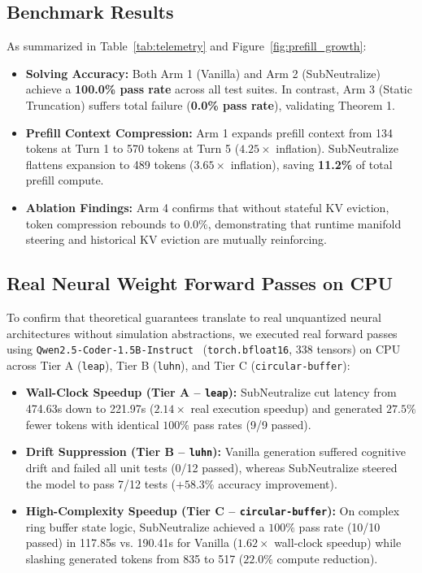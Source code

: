 \documentclass[10pt,twocolumn,letterpaper]{article}
\begin{document}
\subsection{Benchmark Results}
As summarized in Table~\ref{tab:telemetry} and Figure~\ref{fig:prefill_growth}:
\begin{itemize}
    \item \textbf{Solving Accuracy:} Both Arm 1 (Vanilla) and Arm 2 (SubNeutralize) achieve a \textbf{100.0\% pass rate} across all test suites. In contrast, Arm 3 (Static Truncation) suffers total failure (\textbf{0.0\% pass rate}), validating Theorem 1.
    \item \textbf{Prefill Context Compression:} Arm 1 expands prefill context from 134 tokens at Turn 1 to 570 tokens at Turn 5 ($4.25\times$ inflation). SubNeutralize flattens expansion to 489 tokens ($3.65\times$ inflation), saving \textbf{11.2\%} of total prefill compute.
    \item \textbf{Ablation Findings:} Arm 4 confirms that without stateful KV eviction, token compression rebounds to $0.0\%$, demonstrating that runtime manifold steering and historical KV eviction are mutually reinforcing.
\end{itemize}

\subsection{Real Neural Weight Forward Passes on CPU}
To confirm that theoretical guarantees translate to real unquantized neural architectures without simulation abstractions, we executed real forward passes using \texttt{Qwen2.5-Coder-1.5B-Instruct}~\cite{qwen2024coder} (\texttt{torch.bfloat16}, 338 tensors) on CPU across Tier A (\texttt{leap}), Tier B (\texttt{luhn}), and Tier C (\texttt{circular-buffer}):
\begin{itemize}
    \item \textbf{Wall-Clock Speedup (Tier A -- \texttt{leap}):} SubNeutralize cut latency from 474.63s down to 221.97s ($2.14\times$ real execution speedup) and generated $27.5\%$ fewer tokens with identical $100\%$ pass rates (9/9 passed).
    \item \textbf{Drift Suppression (Tier B -- \texttt{luhn}):} Vanilla generation suffered cognitive drift and failed all unit tests (0/12 passed), whereas SubNeutralize steered the model to pass 7/12 tests ($+58.3\%$ accuracy improvement).
    \item \textbf{High-Complexity Speedup (Tier C -- \texttt{circular-buffer}):} On complex ring buffer state logic, SubNeutralize achieved a $100\%$ pass rate (10/10 passed) in 117.85s vs. 190.41s for Vanilla ($1.62\times$ wall-clock speedup) while slashing generated tokens from 835 to 517 ($22.0\%$ compute reduction).
\end{itemize}
\end{document}
